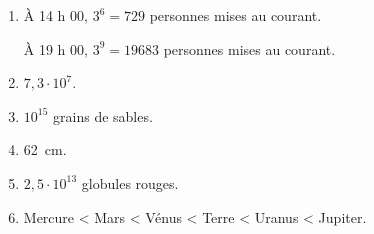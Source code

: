 %
%
  \begin{enumerate}


    \item À 14 h 00, $3^6=729$ personnes mises au courant.\par
          À 19 h 00, $3^9=\num{19 683}$ personnes mises au courant.
    \item $7,3\cdot 10^7$.
    \item $10^{15}$ grains de sables.
    \item \SI{62}{cm}.
    \item $2,5\cdot 10^{13}$ globules rouges.
    \item Mercure < Mars < Vénus < Terre < Uranus < Jupiter.
  \end{enumerate}
